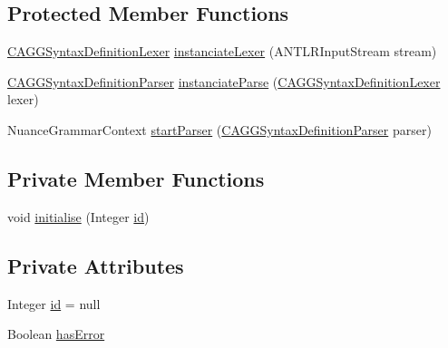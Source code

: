 \subsection*{Protected Member Functions}
\begin{DoxyCompactItemize}
\item 
\hyperlink{classit_1_1emarolab_1_1cagg_1_1core_1_1language_1_1parser_1_1ANTLRInterface_1_1ANTLRGenerated_1_1CAGGSyntaxDefinitionLexer}{C\-A\-G\-G\-Syntax\-Definition\-Lexer} \hyperlink{classit_1_1emarolab_1_1cagg_1_1core_1_1language_1_1parser_1_1TextualParser_abc71c2e32cae41672910e40bd71adf34}{instanciate\-Lexer} (A\-N\-T\-L\-R\-Input\-Stream stream)
\item 
\hyperlink{classit_1_1emarolab_1_1cagg_1_1core_1_1language_1_1parser_1_1ANTLRInterface_1_1ANTLRGenerated_1_1CAGGSyntaxDefinitionParser}{C\-A\-G\-G\-Syntax\-Definition\-Parser} \hyperlink{classit_1_1emarolab_1_1cagg_1_1core_1_1language_1_1parser_1_1TextualParser_af451fdf56be3f1ab666e34a43e9d702f}{instanciate\-Parse} (\hyperlink{classit_1_1emarolab_1_1cagg_1_1core_1_1language_1_1parser_1_1ANTLRInterface_1_1ANTLRGenerated_1_1CAGGSyntaxDefinitionLexer}{C\-A\-G\-G\-Syntax\-Definition\-Lexer} lexer)
\item 
Nuance\-Grammar\-Context \hyperlink{classit_1_1emarolab_1_1cagg_1_1core_1_1language_1_1parser_1_1TextualParser_ae61b8cf20a5399a1d2900656a12992eb}{start\-Parser} (\hyperlink{classit_1_1emarolab_1_1cagg_1_1core_1_1language_1_1parser_1_1ANTLRInterface_1_1ANTLRGenerated_1_1CAGGSyntaxDefinitionParser}{C\-A\-G\-G\-Syntax\-Definition\-Parser} parser)
\end{DoxyCompactItemize}
\subsection*{Private Member Functions}
\begin{DoxyCompactItemize}
\item 
void \hyperlink{classit_1_1emarolab_1_1cagg_1_1core_1_1language_1_1parser_1_1TextualParser_a178fb29100ea6d367a807ca92bb73a0d}{initialise} (Integer \hyperlink{classit_1_1emarolab_1_1cagg_1_1core_1_1language_1_1parser_1_1TextualParser_ad55874c03b0539971ad34a18727399ff}{id})
\end{DoxyCompactItemize}
\subsection*{Private Attributes}
\begin{DoxyCompactItemize}
\item 
Integer \hyperlink{classit_1_1emarolab_1_1cagg_1_1core_1_1language_1_1parser_1_1TextualParser_ad55874c03b0539971ad34a18727399ff}{id} = null
\item 
Boolean \hyperlink{classit_1_1emarolab_1_1cagg_1_1core_1_1language_1_1parser_1_1TextualParser_a97db3f1690e531815e0b316e0bf84418}{has\-Error}
\end{DoxyCompactItemize}



